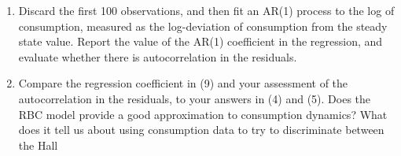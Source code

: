 \documentclass[11pt]{article}
\begin{document}
\begin{enumerate}
\newpage
\item Discard the first 100 observations, and then fit an AR(1) process to the
log of consumption, measured as the log-deviation of consumption from the
steady state value. Report the value of the AR(1) coefficient in the regression,
and evaluate whether there is autocorrelation in the residuals.

\newpage
\item Compare the regression coefficient in (9) and your assessment of the
autocorrelation in the residuals, to your answers in (4) and (5). Does the RBC
model provide a good approximation to consumption dynamics? What does it
tell us about using consumption data to try to discriminate between the Hall
\end{enumerate}
\end{document}
